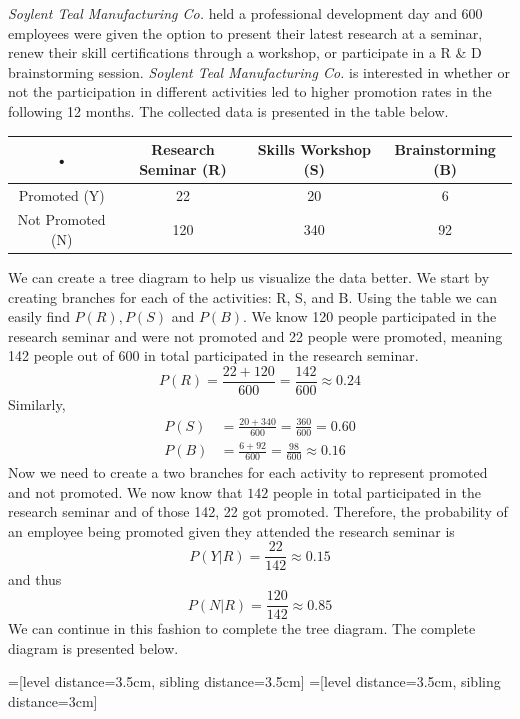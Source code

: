 \begin{example}
\textit{Soylent Teal Manufacturing Co.} held a professional development day and 600 employees were given the option to present their latest research at a seminar, renew their skill certifications through a workshop, or participate in a R \& D brainstorming session. \textit{Soylent Teal Manufacturing Co.} is interested in whether or not the participation in different activities led to higher promotion rates in the following 12 months. The collected data is presented in the table below.

\begin{center}
\begin{tabular}{c|c|c|c}

• & Research Seminar (R) & Skills Workshop (S) & Brainstorming (B) \\ 
\hline
Promoted (Y) & 22 & 20 & 6 \\ 
\hline 
Not Promoted (N) & 120 & 340 & 92 \\ 

\end{tabular} 
\end{center}

We can create a tree diagram to help us visualize the data better. We start by creating branches for each of the activities: R, S, and B. Using the table we can easily find $P(R), P(S)$ and $P(B)$. We know 120 people participated in the research seminar and were not promoted and 22 people were promoted, meaning 142 people out of 600 in total participated in the research seminar.
\[ P(R) = \frac{22+120}{600} = \frac{142}{600} \approx 0.24 \]
Similarly,
\begin{align*}
P(S) &= \frac{20+340}{600} = \frac{360}{600} = 0.60 \\
P(B) &= \frac{6+92}{600} = \frac{98}{600} \approx 0.16
\end{align*}
Now we need to create a two branches for each activity to represent promoted and not promoted. We now know that $142$ people in total participated in the research seminar and of those 142, 22 got promoted. Therefore, the probability of an employee being promoted given they attended the research seminar is
\[ P(Y|R) = \frac{22}{142} \approx 0.15 \]
and thus
\[ P(N|R) = \frac{120}{142} \approx 0.85\]
We can continue in this fashion to complete the tree diagram. The complete diagram is presented below.
\begin{center}
=[level distance=3.5cm, sibling distance=3.5cm]
=[level distance=3.5cm, sibling distance=3cm]


\end{center}
\end{example}
